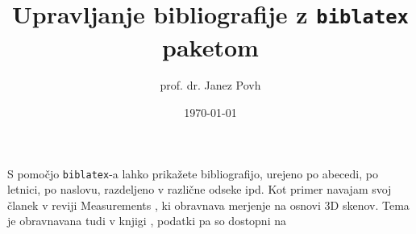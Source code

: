 \documentclass{article}
\title{Upravljanje bibliografije z \texttt{biblatex} paketom}
\author{prof. dr. Janez Povh}
\date{\today }
\begin{document}
	
	\maketitle
	
S pomočjo \texttt{biblatex}-a lahko prikažete bibliografijo, urejeno po abecedi, po letnici, po naslovu, razdeljeno v različne odseke ipd. Kot primer navajam svoj članek 
v reviji Measurements \cite{urbas2022novel}, ki obravnava merjenje na osnovi 3D skenov. Tema je obravnavana tudi v knjigi \cite{baur_plastics_2019}, podatki pa so dostopni na \cite{github_NRO}

\medskip
\printbibliography
\end{document}
